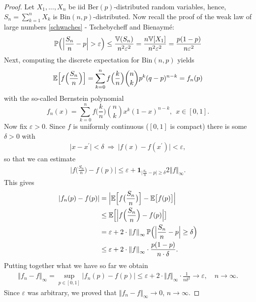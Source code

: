 \begin{proof}[Proof]
	Let $X_1,...,X_n$ be iid Ber$(p)$-distributed random variables, hence, $S_n = \sum_{k=1}^n X_k$ is $\text{Bin}(n,p)$-distributed. Now recall the proof of the weak law of large numbers \eqref{schwaches} - Tschebycheff and Bienaymé:
	\begin{align*}
		\mathbb{P}\Big( \Big| \frac{S_n}{n}-p \Big| > \varepsilon \Big) \leq \frac{\mathbb{V}(S_n)}{n^2 \varepsilon^2} = \frac{n\mathbb{V}[X_1]}{n^2 \varepsilon^2} = \frac{p(1-p)}{n \varepsilon^2}
	\end{align*}
	Next, computing the discrete expectation for $\text{Bin}(n,p)$ yields
	\begin{align*}
		\mathbb{E} \Big[ f \Big( \frac{S_n}{n} \Big) \Big] = \sum_{k=0}^n f \Big(\frac{k}{n}\Big){n\choose k} p^k (q-p)^{n-k} = f_n(p)
	\end{align*}
	with the so-called Bernstein polynomial
		$$f_n(x) =  \sum_{k=0}^n  f \Big(\frac{k}{n}\Big){n\choose k} x^k (1-x)^{n-k},\:\: x\in [0,1].$$
	Now fix $\varepsilon > 0$. Since $f$ is uniformly continuous ($[0,1]$ is compact) there is some $\delta>0$ with
		\begin{align*}
			\lvert x - x^{\prime} \rvert < \delta \: \Rightarrow \: \lvert f(x) - f(x^{\prime}) \rvert < \varepsilon,
		\end{align*}
		so that we can estimate 
		\begin{align*}
			\Big| f \Big( \frac{S_n}{n} \Big) - f(p) \Big| \leq \varepsilon + \mathbf 1_{\lvert \frac{S_n}{n}-p \rvert \geq \delta} 2  \left\Vert f \right\Vert_{\infty}.
		\end{align*}	
		This gives
		\begin{align*}
			\lvert f_n(p) - f(p) \rvert &= \Big| \mathbb{E} \Big[ f \big( \frac{S_n}{n} \big) \Big] - \mathbb{E} \big[ f(p) \big] \Big| \\
									&\leq \mathbb{E} \Big[ \Big| f \Big( \frac{S_n}{n} \Big) - f(p) \Big| \big] \\
									&= \varepsilon + 2 \cdot \left\Vert f \right\Vert_{\infty} \mathbb{P} \Big( \Big| \frac{S_n}{n}-p \Big| \geq \delta \Big) \\
									&\leq \varepsilon +  2 \cdot \left\Vert f \right\Vert_{\infty} \cdot \frac{p(1-p)}{n\cdot \delta}.
		\end{align*}
		Putting together what we have so far we obtain
		\begin{align*}
			\left\Vert f_n - f \right\Vert_{\infty} = \sup_{p \in [0,1]} \lvert f_n(p) - f(p) \rvert \leq \varepsilon +  2 \cdot \left\Vert f \right\Vert_{\infty} \cdot \frac{1}{n \delta^2} \rightarrow \varepsilon,\quad n\to \infty.
		\end{align*}
		Since $\varepsilon$ was arbitrary, we proved that $\left\Vert f_n - f \right\Vert_{\infty} \to 0$, $n \to \infty$.
\end{proof}
